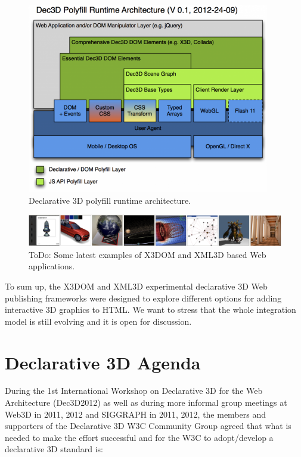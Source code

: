 \documentclass[review]{acmsiggraph}
\begin{document}
\begin{figure}[ht]
  \centering
  \includegraphics[width=\linewidth]{images/Dec3D-Architecture.png}
  \caption{Declarative 3D polyfill runtime architecture.}
\end{figure}

\begin{figure}[ht]
  \centering
  \includegraphics[width=\linewidth]{images/Demos.png}
  \caption{ToDo: Some latest examples of X3DOM and XML3D based Web applications.}
  \vspace{-7px}
\end{figure}

To sum up, the X3DOM and XML3D experimental declarative 3D Web publishing frameworks were designed to explore different options for adding interactive 3D graphics to HTML. We want to stress that the whole integration model is still evolving and it is open for discussion.

\newpage

\section{Declarative 3D Agenda}
\label{sec:Agenda}
During the 1st International Workshop on Declarative 3D for the Web Architecture (Dec3D2012) \cite{Dec3D2012} as well as during more informal group meetings at Web3D in 2011, 2012 and SIGGRAPH in 2011, 2012, the members and supporters of the Declarative 3D W3C Community Group agreed that what is needed to make the effort successful and for the W3C to adopt/develop a declarative 3D standard is:
\end{document}
